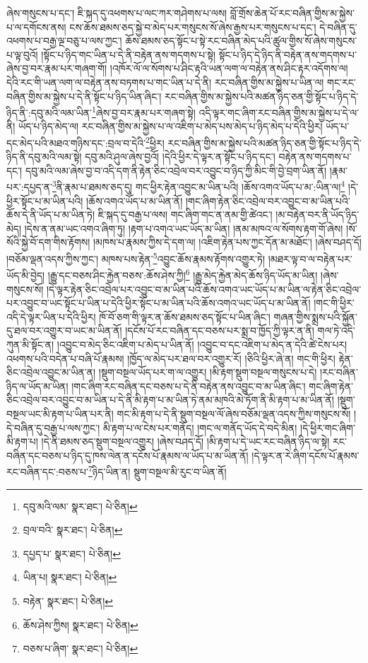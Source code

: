 ཞེས་གསུངས་པ་དང་། ཇི་སྐད་དུ་འཕགས་པ་ལང་ཀར་གཤེགས་པ་ལས། བློ་གྲོས་ཆེན་པོ་རང་བཞིན་གྱིས་མ་སྐྱེས་པ་ལ་དགོངས་ནས། ངས་ཆོས་ཐམས་ཅད་སྐྱེ་བ་མེད་པར་གསུངས་སོ་ཞེས་རྒྱས་པར་གསུངས་པ་དང་། དེ་བཞིན་དུ་འཕགས་པ་བརྒྱ་ལྔ་བཅུ་པ་ལས་ཀྱང་། ཆོས་ཐམས་ཅད་སྟོང་པ་སྟེ་རང་བཞིན་མེད་པའི་ཚུལ་གྱིས་སོ་ཞེས་གསུངས་པ་ལྟ་བུའོ། །སྟོང་པ་ཉིད་གང་ཡིན་པ་དེ་ནི་བརྟེན་ནས་གདགས་པ་སྟེ། སྟོང་པ་ཉིད་དེ་ཉིད་ནི་བརྟེན་ནས་གདགས་པ་ཞེས་བྱ་བར་རྣམ་པར་གཞག་གོ། །འཁོར་ལོ་ལ་སོགས་པ་ཤིང་རྟའི་ཡན་ལག་ལ་བརྟེན་ནས་ཤིང་རྟར་འདོགས་ལ། དེའི་རང་གི་ཡན་ལག་ལ་བརྟེན་ནས་བཏགས་པ་གང་ཡིན་པ་དེ་ནི། རང་བཞིན་གྱིས་མ་སྐྱེས་པ་ཡིན་ལ། གང་རང་བཞིན་གྱིས་མ་སྐྱེས་པ་དེ་ནི་སྟོང་པ་ཉིད་ཡིན་ཞིང་། རང་བཞིན་གྱིས་མ་སྐྱེས་པའི་མཚན་ཉིད་ཅན་གྱི་སྟོང་པ་ཉིད་དེ་ཉིད་ནི་:དབུ་མའི་ལམ་ཡིན་\footnote{དབུ་མའི་ལམ་  སྣར་ཐང་།  པེ་ཅིན། }ཞེས་བྱ་བར་རྣམ་པར་གཞག་སྟེ། འདི་ལྟར་གང་ཞིག་རང་བཞིན་གྱིས་མ་སྐྱེས་པ་དེ་ལ་ནི། ཡོད་པ་ཉིད་མེད་ལ། རང་བཞིན་གྱིས་མ་སྐྱེས་པ་ལ་འཇིག་པ་མེད་པས་མེད་པ་ཉིད་མེད་པ་དེའི་ཕྱིར། ཡོད་པ་དང་མེད་པའི་མཐའ་གཉིས་དང་:བྲལ་བ་དེའི་\footnote{བྲལ་བའི་  སྣར་ཐང་།  པེ་ཅིན། }ཕྱིར། རང་བཞིན་གྱིས་མ་སྐྱེས་པའི་མཚན་ཉིད་ཅན་གྱི་སྟོང་པ་ཉིད་དེ་ཉིད་ནི་དབུ་མའི་ལམ་སྟེ། དབུ་མའི་ཤུལ་ཞེས་བྱའོ། །དེའི་ཕྱིར་དེ་ལྟར་ན་སྟོང་པ་ཉིད་དང་། བརྟེན་ནས་གདགས་པ་དང་། དབུ་མའི་ལམ་ཞེས་བྱ་བ་འདི་དག་ནི་རྟེན་ཅིང་འབྲེལ་བར་འབྱུང་བ་ཉིད་ཀྱི་མིང་གི་བྱེ་བྲག་ཡིན་ནོ། །རྣམ་པར་:དཔྱད་ན་\footnote{དཔྱད་པ་  སྣར་ཐང་།  པེ་ཅིན། }ནི་རྣམ་པ་ཐམས་ཅད་དུ། གང་ཕྱིར་རྟེན་འབྱུང་མ་ཡིན་པའི། །ཆོས་འགའ་ཡོད་པ་མ་:ཡིན་ལ།\footnote{ཡིན་པ།  སྣར་ཐང་།  པེ་ཅིན། } །དེ་ཕྱིར་སྟོང་པ་མ་ཡིན་པའི། །ཆོས་འགའ་ཡོད་པ་མ་ཡིན་ནོ། །གང་ཞིག་རྟེན་ཅིང་འབྲེལ་བར་འབྱུང་བ་མ་ཡིན་པའི་ཆོས་དེ་ནི་ཡོད་པ་མ་ཡིན་ཏེ། ཇི་སྐད་དུ་བརྒྱ་པ་ལས། གང་ཞིག་གང་ན་ནམ་གྱི་ཚེའང་། །མ་བརྟེན་བར་ནི་ཡོད་ཉིད་མེད། །དེས་ན་ནམ་ཡང་འགའ་ཞིག་ཏུ། །རྟག་པ་འགའ་ཡང་ཡོད་མ་ཡིན། །ནམ་མཁའ་ལ་སོགས་རྟག་གོ་ཞེས། །སོ་སོའི་སྐྱེ་བོ་དག་གིས་རྟོགས། །མཁས་པ་རྣམས་ཀྱིས་དེ་དག་ལ། །འཇིག་རྟེན་པས་ཀྱང་དོན་མ་མཐོང་། །ཞེས་བཤད་དོ། །བཅོམ་ལྡན་འདས་ཀྱིས་ཀྱང་། མཁས་པས་རྟེན་\footnote{བརྟེན་  སྣར་ཐང་།  པེ་ཅིན། }འབྱུང་ཆོས་རྣམས་རྟོགས་འགྱུར་ཏེ། །མཐར་ལྟ་བ་ལ་བརྟེན་པར་ཡོད་མི་བྱེད། །རྒྱུ་དང་བཅས་ཤིང་རྐྱེན་བཅས་:ཆོས་ཤེས་ཀྱི།\footnote{ཆོས་ཤེས་ཀྱིས།  སྣར་ཐང་།  པེ་ཅིན། } །རྒྱུ་མེད་རྐྱེན་མེད་ཆོས་ཉིད་ཡོད་མ་ཡིན། །ཞེས་གསུངས་སོ། །དེ་ལྟར་རྟེན་ཅིང་འབྲེལ་པར་འབྱུང་བ་མ་ཡིན་པའི་ཆོས་འགའ་ཡང་ཡོད་པ་མ་ཡིན་ལ་རྟེན་ཅིང་འབྲེལ་པར་འབྱུང་བ་ཡང་སྟོང་པ་ཡིན་པ་དེའི་ཕྱིར་སྟོང་པ་མ་ཡིན་པའི་ཆོས་འགའ་ཡང་ཡོད་པ་མ་ཡིན་ནོ། །གང་གི་ཕྱིར་འདི་དེ་ལྟར་ཡིན་པ་དེའི་ཕྱིར། ཁོ་བོ་ཅག་གི་ལྟར་ན་ཆོས་ཐམས་ཅད་སྟོང་པ་ཡིན་ཞིང་། གཞན་གྱིས་སྨྲས་པའི་སྐྱོན་དུ་ཐལ་བར་འགྱུར་བ་ཡང་མ་ཡིན་ནོ། །དངོས་པོ་རང་བཞིན་དང་བཅས་པར་སྨྲ་བ་ཁྱོད་ཀྱི་ལྟར་ན་ནི། གལ་ཏེ་འདི་ཀུན་མི་སྟོང་ན། །འབྱུང་བ་མེད་ཅིང་འཇིག་པ་མེད་པ་ཡིན་ནོ། །འབྱུང་བ་དང་འཇིག་པ་མེད་ན་དེའི་ཚེ་ངེས་པར། འཕགས་པའི་བདེན་པ་བཞི་པོ་རྣམས། །ཁྱོད་ལ་མེད་པར་ཐལ་བར་འགྱུར་རོ། །ཅིའི་ཕྱིར་ཞེ་ན། གང་གི་ཕྱིར། རྟེན་ཅིང་འབྲེལ་འབྱུང་མ་ཡིན་ན། །སྡུག་བསྔལ་ཡོད་པར་ག་ལ་འགྱུར། །མི་རྟག་སྡུག་བསྔལ་གསུངས་པ་དེ། །རང་བཞིན་ཉིད་ལ་ཡོད་མ་ཡིན། །གང་ཞིག་རང་བཞིན་དང་བཅས་པ་དེ་ནི་བརྟེན་ནས་འབྱུང་བ་མ་ཡིན་ཞིང་། གང་ཞིག་རྟེན་ཅིང་འབྲེལ་བར་འབྱུང་བ་མ་ཡིན་པ་དེ་ནི་མི་རྟག་པ་མ་ཡིན་ཏེ་ནམ་མཁའི་མེ་ཏོག་ནི་མི་རྟག་པ་མ་ཡིན་ནོ། །སྡུག་བསྔལ་ཡང་མི་རྟག་པ་ཡིན་པར་ནི། གང་མི་རྟག་པ་དེ་ནི་སྡུག་བསྔལ་ལོ་ཞེས་བཅོམ་ལྡན་འདས་ཀྱིས་གསུངས་སོ། །དེ་བཞིན་དུ་བརྒྱ་པ་ལས་ཀྱང་། མི་རྟག་པ་ལ་ངེས་པར་གནོད། །གང་ལ་གནོད་ཡོད་དེ་བདེ་མིན། །དེ་ཕྱིར་གང་ཞིག་མི་རྟག་པ། །དེ་ནི་ཐམས་ཅད་སྡུག་བསྔལ་འགྱུར། །ཞེས་བཤད་དོ། །མི་རྟག་པ་དེ་ཡང་རང་བཞིན་ཉིད་ལ་སྟེ། རང་བཞིན་དང་བཅས་པ་ཉིད་དུ་ཁས་ལེན་ན་དངོས་པོ་རྣམས་ལ་ཡོད་པ་མ་ཡིན་ནོ། །དེ་ལྟར་ན་རེ་ཞིག་དངོས་པོ་རྣམས་རང་བཞིན་དང་:བཅས་པ་\footnote{བཅས་པ་ཞིག་  སྣར་ཐང་།  པེ་ཅིན། }ཉིད་ཡིན་ན། སྡུག་བསྔལ་མི་རུང་བ་ཡིན་ནོ། 